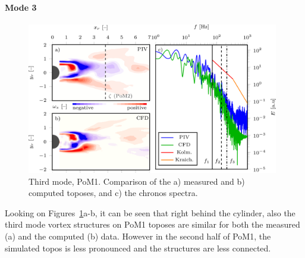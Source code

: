 {\paragraph{Mode 3}
\begin{figure}[htbp]
    \centering
    \includegraphics[width=0.98\textwidth]{02_images/00_export/figure13.png}
    \caption{{Third mode, PoM1.} Comparison of the a) measured and b) computed toposes, and c) the chronos spectra.}
    \label{fig:mod3}
\end{figure}
Looking on Figures~\ref{fig:mod3}a-b, {it can be seen that right behind the cylinder, } also the third mode vortex structures on PoM1 {toposes are} similar for both the measured (a) and the computed (b) data. However in the second half of PoM1, the simulated topos is less pronounced and the structures are less connected. 


}
